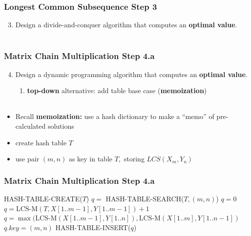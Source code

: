 \documentclass[10pt,aspectratio=169]{beamer}
\newcommand{\stanza}{ \\~\ }
\begin{document}
\begin{frame} \frametitle{Longest Common Subsequence Step 3}
  \begin{enumerate}
    \setcounter{enumi}{2}
    \item Design a divide-and-conquer algorithm that computes an \textbf{optimal value}.
    \stanza
  \end{enumerate}

  {\scriptsize
  \begin{algorithmic}[1]
      \State {}
      \State {}
    \Else
      \State {}
    \EndIf
    \EndFunction
  \end{algorithmic}
  }
\end{frame}
    
  \begin{frame} \frametitle{Matrix Chain Multiplication Step 4.a}
    \begin{enumerate}
      \setcounter{enumi}{3}
      \item Design a dynamic programming algorithm that computes an \textbf{optimal value}.
      \begin{enumerate}
        \item \textbf{top-down} alternative: add table base case (\textbf{memoization})
        \stanza
      \end{enumerate}
  \end{enumerate}

  \begin{itemize}
    \item Recall \textbf{memoization:} use a hash dictionary to make a ``memo'' of pre-calculated solutions
    \item create hash table $T$
    \item use pair $(m, n)$ as key in table $T,$ storing $LCS(X_m, Y_n)$
  \end{itemize}
  
\end{frame}  

\begin{frame} \frametitle{Matrix Chain Multiplication Step 4.a}
  {\scriptsize
  \begin{algorithmic}[1]
    \State HASH-TABLE-CREATE($T$)
    \State {}
    \EndFunction
    \State $q = $ HASH-TABLE-SEARCH($T, (m, n)$)
      \State {}
    \EndIf
      \State $q=0$
      \State $q = \text{LCS-M}(T, X[1..m-1], Y[1..m-1]) + 1$
    \Else
      \State $q = \max(\text{LCS-M}(X[1..m-1], Y[1..n]), \text{LCS-M}(X[1..m], Y[1..n-1])$
    \EndIf
    \State $q.key = (m, n)$
    \State HASH-TABLE-INSERT($q$)
    \State {}
    \EndFunction
  \end{algorithmic}
  }
\end{frame}
\end{document}

